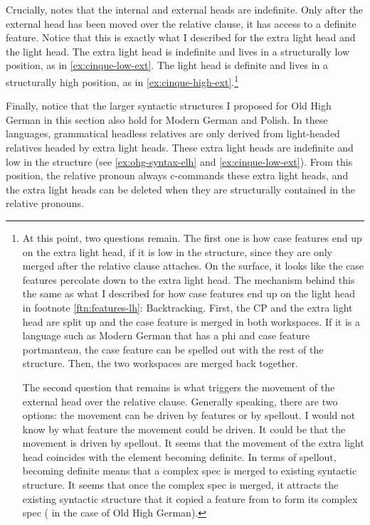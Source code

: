 Crucially, \citet{cinqueforthcoming} notes that the internal and external heads are indefinite. Only after the external head has been moved over the relative clause, it has access to a definite feature. Notice that this is exactly what I described for the extra light head and the light head. The extra light head is indefinite and lives in a structurally low position, as in \ref{ex:cinque-low-ext}. The light head is definite and lives in a structurally high position, as in \ref{ex:cinque-high-ext}.\footnote{
At this point, two questions remain. The first one is how case features end up on the extra light head, if it is low in the structure, since they are only merged after the relative clause attaches. On the surface, it looks like the case features percolate down to the extra light head. The mechanism behind this the same as what I described for how case features end up on the light head in footnote \ref{ftn:features-lh}: Backtracking. First, the CP and the extra light head are split up and the case feature is merged in both workspaces. If it is a language such as Modern German that has a phi and case feature portmanteau, the case feature can be spelled out with the rest of the structure. Then, the two workspaces are merged back together.

The second question that remains is what triggers the movement of the external head over the relative clause. Generally speaking, there are two options: the movement can be driven by features or by spellout. I would not know by what feature the movement could be driven. It could be that the movement is driven by spellout. It seems that the movement of the extra light head coincides with the element becoming definite. In terms of spellout, becoming definite means that a complex spec is merged to existing syntactic structure. It seems that once the complex spec is merged, it attracts the existing syntactic structure that it copied a feature from to form its complex spec ( in the case of Old High German).
}

Finally, notice that the larger syntactic structures I proposed for Old High German in this section also hold for Modern German and Polish. In these languages, grammatical headless relatives are only derived from light-headed relatives headed by extra light heads. These extra light heads are indefinite and low in the structure (see \ref{ex:ohg-syntax-elh} and \ref{ex:cinque-low-ext}). From this position, the relative pronoun always c-commands these extra light heads, and the extra light heads can be deleted when they are structurally contained in the relative pronouns.


